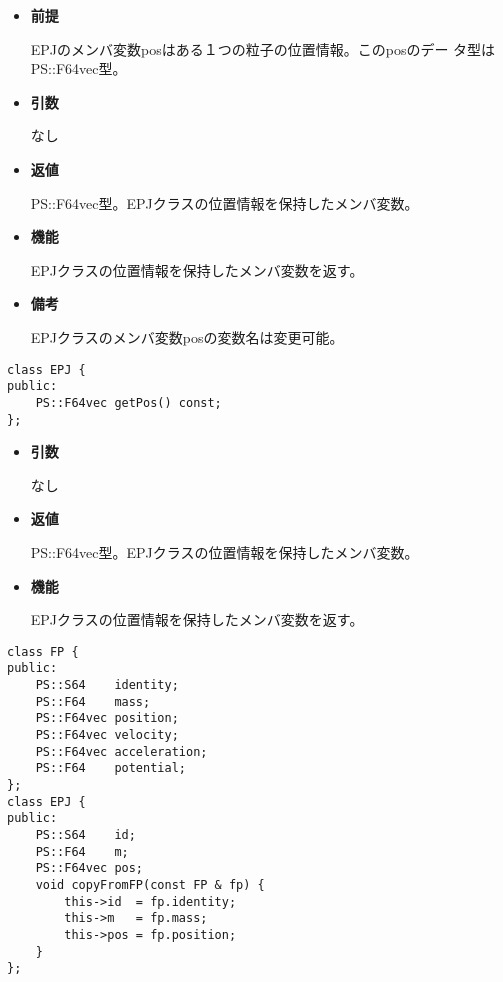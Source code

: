 \begin{itemize}

\item {\bf 前提}
  
  EPJのメンバ変数posはある１つの粒子の位置情報。このposのデー
  タ型はPS::F64vec型。
  
\item {\bf 引数}

  なし
  
\item {\bf 返値}

  PS::F64vec型。EPJクラスの位置情報を保持したメンバ変数。
  
\item {\bf 機能}

  EPJクラスの位置情報を保持したメンバ変数を返す。
  
\item {\bf 備考}

  EPJクラスのメンバ変数posの変数名は変更可能。

\end{itemize}
\fi

\begin{screen}
\begin{verbatim}
class EPJ {
public:
    PS::F64vec getPos() const;
};
\end{verbatim}
\end{screen}

\begin{itemize}

\item {\bf 引数}

  なし
  
\item {\bf 返値}

  PS::F64vec型。EPJクラスの位置情報を保持したメンバ変数。
  
\item {\bf 機能}

  EPJクラスの位置情報を保持したメンバ変数を返す。
  
\end{itemize}



\begin{screen}
\begin{verbatim}
class FP {
public:
    PS::S64    identity;
    PS::F64    mass;
    PS::F64vec position;
    PS::F64vec velocity;
    PS::F64vec acceleration;
    PS::F64    potential;
};
class EPJ {
public:
    PS::S64    id;
    PS::F64    m;
    PS::F64vec pos;
    void copyFromFP(const FP & fp) {
        this->id  = fp.identity;
        this->m   = fp.mass;
        this->pos = fp.position;
    }
};
\end{verbatim}
\end{screen}

